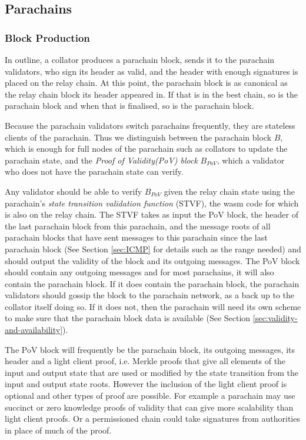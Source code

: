 \subsection{Parachains}

\subsubsection{Block Production}\label{sec:parachainblockproduction}
In outline, a collator produces a parachain block, sends it to the parachain validators,
who sign its header as valid, and the header with enough signatures is placed on the relay chain.
At this point, the parachain block is as canonical as the relay chain block its header appeared in.
If that is in the best chain, so is the parachain block and when that is finalised, so is the parachain block.

Because the parachain validators switch parachains frequently, they are stateless clients of the parachain.
Thus we distinguish between the parachain block $B$, which is enough for full nodes of the parachain such as collators to update the parachain state,
and the {\em Proof of Validity(PoV) block} $B_{PoV}$, which a validator who does not have the parachain state can verify.

Any validator should be able to verify $B_{PoV}$ given the relay chain state using the parachain's {\em state transition validation function} (STVF),
the wasm code for which is also on the relay chain.
The STVF takes as input the PoV block, the header of the last parachain block from this parachain,
and the message roots of all parachain blocks that have sent messages to this parachain since the last parachain block
(See Section \ref{sec:ICMP} for details such as the range needed) and should output the validity of the block and its outgoing messages.
The PoV block should contain any outgoing messages and for most parachains, it will also contain the parachain block.
If it does contain the parachain block, the parachain validators should gossip the block to the parachain network, as a back up to the collator itself doing so.
If it does not, then the parachain will need its own scheme to make sure that the parachain block data is available (See Section \ref{sec:validity-and-availability}).

The PoV block will frequently be the parachain block, its outgoing messages, its header and a light client proof,
i.e. Merkle proofs that give all elements of the input and output state that are used or modified by the state transition from the input and output state roots.
However the inclusion of the light client proof is optional and other types of proof are possible.
For example a parachain may use succinct or zero knowledge proofs of validity that can give more scalability than light client proofs.
Or a permissioned chain could take signatures from authorities in place of much of the proof.

